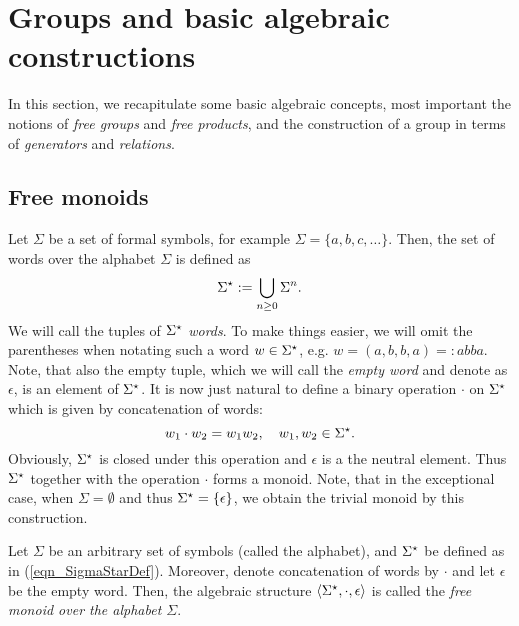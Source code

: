 \section{Groups and basic algebraic constructions}

In this section, we recapitulate some basic algebraic concepts, most important the notions of \emph{free groups} and \emph{free products}, and the construction of a group in terms of \emph{generators} and \emph{relations}. 

\subsection{Free monoids}
Let $\Sigma$ be a set of formal symbols, for example $\Sigma = \{a, b, c, \dots\}$. Then, the set of words over the alphabet $\Sigma$ is defined as
\begin{equation}
\label{eqn_SigmaStarDef}
{\Sigma}^{\star} := \bigcup_{n\ge0} \Sigma^n.
\end{equation}
We will call the tuples of ${\Sigma}^{\star}$ \emph{words}. To make things easier, we will omit the parentheses when notating such a word $w \in {\Sigma}^{\star}$, e.g. $w = (a,b,b,a) =: abba$. Note, that also the empty tuple, which we will call the \emph{empty word} and denote as $\epsilon$, is an element of ${\Sigma}^{\star}$. It is now just natural to define a binary operation $\cdot$ on ${\Sigma}^{\star}$ which is given by concatenation of words:
\begin{equation*}
w_1 \cdot w_2 = w_1 w_2, \quad w_1, w_2 \in {\Sigma}^{\star}.
\end{equation*}
Obviously, ${\Sigma}^{\star}$ is closed under this operation and $\epsilon$ is a the neutral element. Thus ${\Sigma}^{\star}$ together with the operation $\cdot$ forms a monoid. Note, that in the exceptional case, when $\Sigma = \emptyset$ and thus ${\Sigma}^{\star} = \{\epsilon\}$, we obtain the trivial monoid by this construction. 

\begin{definition}
\label{dfn_FreeMonoid}
Let $\Sigma$ be an arbitrary set of symbols (called the alphabet), and ${\Sigma}^{\star}$ be defined as in (\ref{eqn_SigmaStarDef}). Moreover, denote concatenation of words by $\cdot$ and let $\epsilon$ be the empty word. Then, the algebraic structure $\langle {\Sigma}^{\star}, \cdot, \epsilon \rangle$ is called the \emph{free monoid over the alphabet $\Sigma$}.
\end{definition} 

